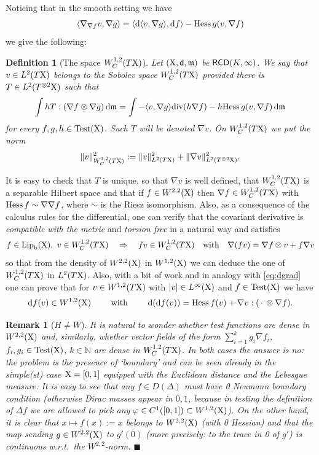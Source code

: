\documentclass[11pt]{article}
\numberwithin{equation}{section}
\newtheorem{definition}[theorem]{Definition}
\newtheorem{remark}[theorem]{Remark}
\newcommand{\N}{\mathbb{N}}
\newcommand{\X}{{\rm X}}
\newcommand{\sfd}{{\sf d}}
\newcommand{\mm}{{\mathfrak m}}
\newcommand{\LIP}{{\rm Lip}}
\newcommand{\RCD}{{\sf RCD}}
\renewcommand{\d}{{\rm d}}
\renewcommand{\div}{{\rm div}}
\renewcommand{\b}{{\rm b}}
\newcommand{\fr}{\penalty-20\null\hfill$\blacksquare$}         %
\newcommand\la{\langle}
\newcommand\ra{\rangle}
\newcommand{\test}{{\rm Test}}
\begin{document}
Noticing that in the smooth setting we have
\[
\la\nabla_{\nabla f}v,\nabla g\ra=\la\d\la v,\nabla g\ra,\d f\ra-{\rm Hess}\,g(v,\nabla f)
\]
we give the following:
\begin{definition}[The space $W^{1,2}_C(T\X)$]
Let $(\X,\sfd,\mm)$ be $\RCD(K,\infty)$. We say that $v\in L^2(T\X)$ belongs to the Sobolev space $W^{1,2}_C(T\X)$ provided there is $T\in L^2(T^{\otimes 2}\X)$ such that
\begin{equation}
\label{eq:defcov}
\int h T:(\nabla f\otimes\nabla g)\,\d\mm=\int- \la v,\nabla g\ra\div(h\nabla f)-h{\rm Hess}\,g(v,\nabla f)\,\d\mm 
\end{equation}
for every $f,g,h\in\test(\X)$. Such $T$ will be denoted $\nabla v$. On $W^{1,2}_C(T\X)$ we put the norm
\[
\|v\|_{W^{1,2}_C(T\X)}^2:=\|v\|^2_{L^2(T\X)}+\|\nabla v\|_{L^2(T^{\otimes 2}\X)}^2.
\] 
\end{definition}
It is easy to check that $T$ is unique, so that $\nabla v$ is well defined, that $W^{1,2}_C(T\X)$ is a separable Hilbert space and that if $f\in W^{2,2}(\X)$ then $\nabla f\in W^{1,2}_C(T\X)$ with ${\rm Hess}\,f\sim \nabla\nabla f$, where $\sim$ is the Riesz isomorphism. Also, as a consequence of the calculus rules for the differential, one can verify that  the covariant derivative  is \emph{compatible with the metric} and \emph{torsion free} in a natural way and satisfies
\[
f\in \LIP_\b(\X),\ v\in W^{1,2}_C(T\X)\quad\Rightarrow\quad fv\in W^{1,2}_C(T\X)\quad\text{with}\quad \nabla(fv)=\nabla f\otimes v+f\nabla v
\]
so that from the density of $W^{2,2}(\X)$ in $W^{1,2}(\X)$ we can deduce the one of $W^{1,2}_C(T\X)$ in $L^2(T\X)$. Also, with a bit of work and in analogy with \eqref{eq:dgrad} one can prove that for $v\in W^{1,2}(T\X)$ with $|v|\in L^\infty(\X)$ and $f\in\test(\X)$ we have
\begin{equation}
\label{eq:leibcov}
\text{$\d f(v)\in W^{1,2}(\X)\qquad$ with }\qquad\d (\d f(v)) ={\rm Hess}\,f(v)+\nabla v:(\,\cdot\,\otimes\nabla f ).
\end{equation}
\begin{remark}[$H\neq W$]\label{re:honda}{\rm It is natural to wonder whether test functions are dense in $W^{2,2}(\X)$ and, similarly, whether vector fields of the form $\sum_{i=1}^kg_i\nabla f_i$, $f_i,g_i\in \test(\X)$, $k\in\N$ are dense in $W^{1,2}_C(T\X)$. In both cases the answer is \emph{no}: the problem is the presence of `boundary' and can be seen already in the simple(st) case $\X=[0,1]$ equipped with the Euclidean distance and the Lebesgue measure. It is easy to see that  any $f\in D(\Delta)$ must have 0 Neumann boundary condition (otherwise Dirac masses appear in $0,1$, because in testing the definition of $\Delta f$ we are allowed to pick any $\varphi\in C^1([0,1])\subset W^{1,2}(\X)$). On the other hand, it is clear that $x\mapsto f(x):=x$  belongs to $W^{2,2}(\X)$ (with 0 Hessian) and that the map sending $g\in W^{2,2}(\X)$ to $g'(0)$ (more precisely: to the trace in 0 of $g'$) is continuous w.r.t.\ the $W^{2,2}$-norm.
}\fr\end{remark}
\end{document}
